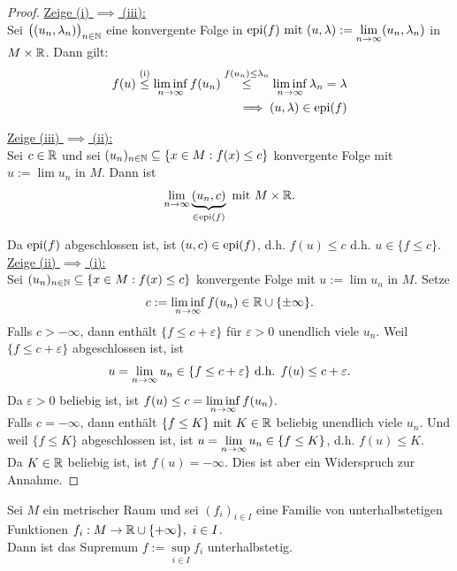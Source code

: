 \begin{proof}
	\underline{Zeige (i) $\implies$ (iii):}\\
	Sei $\big((u_n,\lambda_n)\big)_{n\in\mathbb{N}}$ eine konvergente Folge in $\operatorname{epi}(f)\text{ mit }(u,\lambda):=\lim\limits_{n\to\infty}(u_n,\lambda_n)$ in $M\times\mathbb{R}$. 
	Dann gilt:
	\begin{align*}
		f(u)
		\stackrel{\text{(i)}}{\leq}
		\liminf\limits_{n\to\infty} f(u_n)
		\stackrel{f(u_n)\leq\lambda_n}{\leq}
		\liminf\limits_{n\to\infty} \lambda_n
		=\lambda\\
		\implies
		(u,\lambda)\in\operatorname{epi}(f)
	\end{align*}

	\underline{Zeige (iii) $\implies$ (ii):}\\
	Sei $c\in\mathbb{R}$ und sei $(u_n)_{n\in\mathbb{N}}\subseteq\lbrace x\in M:f(x)\leq c\rbrace$ konvergente Folge mit $u:=\lim u_n$ in $M$. 
	Dann ist
	\begin{align*}
		\lim\limits_{n\to\infty}\underbrace{(u_n,c)}_{\in\operatorname{epi}(f)}\text{ mit } M\times\mathbb{R}.
	\end{align*}

	Da $\operatorname{epi}(f)$ abgeschlossen ist, ist $(u,c)\in\operatorname{epi}(f)$, d.h. $f(u)\leq c$ d.h. $u\in\lbrace f\leq c\rbrace$.\nl
	\underline{Zeige (ii) $\implies$ (i):}\\
	Sei $(u_n)_{n\in\mathbb{N}}\subseteq\lbrace x\in M:f(x)\leq c\rbrace$ konvergente Folge mit $u:=\lim u_n$ in $M$. 
	Setze
	\begin{align*}
		c:=\liminf\limits_{n\to\infty} f(u_n)\in\mathbb{R}\cup\lbrace\pm\infty\rbrace.
	\end{align*}
	Falls $c>-\infty$, dann enthält $\lbrace f\leq c+\varepsilon\rbrace$ für $\varepsilon>0$ unendlich viele $u_n$. 
	Weil $\lbrace f\leq c+\varepsilon\rbrace$ abgeschlossen ist, ist
	\begin{align*}
		u=\lim\limits_{n\to\infty} u_n\in\lbrace f\leq c+\varepsilon\rbrace\text{ d.h. } f(u)\leq c+\varepsilon.
	\end{align*}
	Da $\varepsilon>0$ beliebig ist, ist $f(u)\leq c=\liminf\limits\limits_{n\to\infty} f(u_n)$.\\
	Falls $c=-\infty$, dann enthält $\lbrace f\leq K\rbrace\text{ mit } K\in\mathbb{R}$ beliebig unendlich viele $u_n$. 
	Und weil $\lbrace f\leq K\rbrace$ abgeschlossen ist, ist $u=\lim\limits_{n\to\infty} u_n\in\lbrace f\leq K\rbrace$, d.h. $f(u)\leq K$.\\
	Da $K\in\mathbb{R}$ beliebig ist, ist $f(u)=-\infty$. 
	Dies ist aber ein Widerspruch zur Annahme.
\end{proof}

\begin{lemma}
	Sei $M$ ein metrischer Raum und sei $(f_i)_{i\in I}$ eine Familie von unterhalbstetigen Funktionen $f_i:M\to\mathbb{R}\cup\lbrace+\infty\rbrace,~i\in I$.\\
	Dann ist das Supremum $f:=\sup\limits_{i\in I} f_i$ unterhalbstetig.
\end{lemma}

